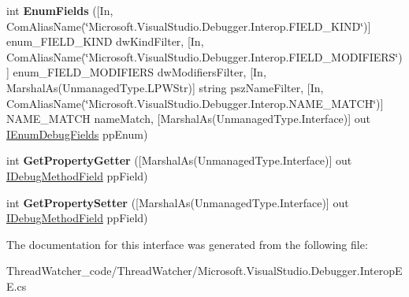 \begin{DoxyCompactItemize}
\item 
\hypertarget{interface_microsoft_1_1_visual_studio_1_1_debugger_1_1_interop_e_e_1_1_i_debug_property_field_ab1611b086b1c2a9a365fbe0ac392c7cf}{int {\bfseries Enum\+Fields} (\mbox{[}In, Com\+Alias\+Name(\char`\"{}Microsoft.\+Visual\+Studio.\+Debugger.\+Interop.\+F\+I\+E\+L\+D\+\_\+\+K\+I\+N\+D\char`\"{})\mbox{]} enum\+\_\+\+F\+I\+E\+L\+D\+\_\+\+K\+I\+N\+D dw\+Kind\+Filter, \mbox{[}In, Com\+Alias\+Name(\char`\"{}Microsoft.\+Visual\+Studio.\+Debugger.\+Interop.\+F\+I\+E\+L\+D\+\_\+\+M\+O\+D\+I\+F\+I\+E\+R\+S\char`\"{})\mbox{]} enum\+\_\+\+F\+I\+E\+L\+D\+\_\+\+M\+O\+D\+I\+F\+I\+E\+R\+S dw\+Modifiers\+Filter, \mbox{[}In, Marshal\+As(Unmanaged\+Type.\+L\+P\+W\+Str)\mbox{]} string psz\+Name\+Filter, \mbox{[}In, Com\+Alias\+Name(\char`\"{}Microsoft.\+Visual\+Studio.\+Debugger.\+Interop.\+N\+A\+M\+E\+\_\+\+M\+A\+T\+C\+H\char`\"{})\mbox{]} N\+A\+M\+E\+\_\+\+M\+A\+T\+C\+H name\+Match, \mbox{[}Marshal\+As(Unmanaged\+Type.\+Interface)\mbox{]} out \hyperlink{interface_microsoft_1_1_visual_studio_1_1_debugger_1_1_interop_e_e_1_1_i_enum_debug_fields}{I\+Enum\+Debug\+Fields} pp\+Enum)}\label{interface_microsoft_1_1_visual_studio_1_1_debugger_1_1_interop_e_e_1_1_i_debug_property_field_ab1611b086b1c2a9a365fbe0ac392c7cf}

\item 
\hypertarget{interface_microsoft_1_1_visual_studio_1_1_debugger_1_1_interop_e_e_1_1_i_debug_property_field_a3be951dd4b2aab87dfa91ccbb9c86f8f}{int {\bfseries Get\+Property\+Getter} (\mbox{[}Marshal\+As(Unmanaged\+Type.\+Interface)\mbox{]} out \hyperlink{interface_microsoft_1_1_visual_studio_1_1_debugger_1_1_interop_e_e_1_1_i_debug_method_field}{I\+Debug\+Method\+Field} pp\+Field)}\label{interface_microsoft_1_1_visual_studio_1_1_debugger_1_1_interop_e_e_1_1_i_debug_property_field_a3be951dd4b2aab87dfa91ccbb9c86f8f}

\item 
\hypertarget{interface_microsoft_1_1_visual_studio_1_1_debugger_1_1_interop_e_e_1_1_i_debug_property_field_a1b06f141a8f6255bc34993cad5814219}{int {\bfseries Get\+Property\+Setter} (\mbox{[}Marshal\+As(Unmanaged\+Type.\+Interface)\mbox{]} out \hyperlink{interface_microsoft_1_1_visual_studio_1_1_debugger_1_1_interop_e_e_1_1_i_debug_method_field}{I\+Debug\+Method\+Field} pp\+Field)}\label{interface_microsoft_1_1_visual_studio_1_1_debugger_1_1_interop_e_e_1_1_i_debug_property_field_a1b06f141a8f6255bc34993cad5814219}

\end{DoxyCompactItemize}


The documentation for this interface was generated from the following file\+:\begin{DoxyCompactItemize}
\item 
Thread\+Watcher\+\_\+code/\+Thread\+Watcher/Microsoft.\+Visual\+Studio.\+Debugger.\+Interop\+E\+E.\+cs\end{DoxyCompactItemize}
